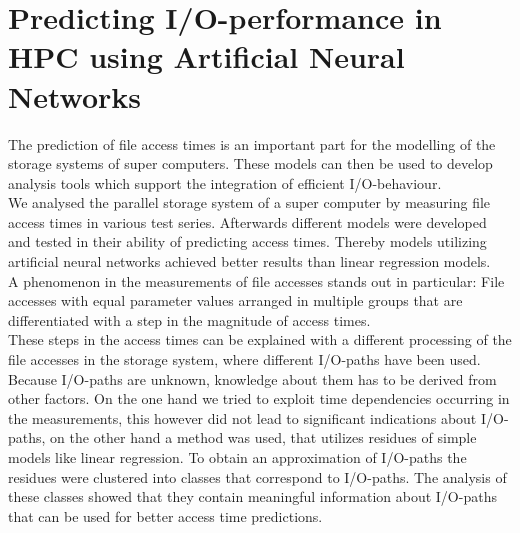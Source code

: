 \documentclass[11pt]{scrartcl}
\begin{document}
\section*{{\large Predicting I/O-performance in HPC using Artificial Neural Networks}}

The prediction of file access times is an important part for the modelling of the storage systems of super computers.
These models can then be used to develop analysis tools which support the integration of efficient I/O-behaviour.\\
We analysed the parallel storage system of a super computer by measuring file access times in various test series.
Afterwards different models were developed and tested in their ability of predicting access times.
Thereby models utilizing artificial neural networks achieved better results than linear regression models.\\
A phenomenon in the measurements of file accesses stands out in particular: File accesses with equal parameter values arranged in multiple groups that are differentiated with a step in the magnitude of access times.\\
These steps in the access times can be explained with a different processing of the file accesses in the storage system, where different I/O-paths have been used.
Because I/O-paths are unknown, knowledge about them has to be derived from other factors.
On the one hand we tried to exploit time dependencies occurring in the measurements, this however did not lead to significant indications about I/O-paths, on the other hand a method was used, that utilizes residues of simple models like linear regression.
To obtain an approximation of I/O-paths the residues were clustered into classes that correspond to I/O-paths.
The analysis of these classes showed that they contain meaningful information about I/O-paths that can be used for better access time predictions.
\end{document}
